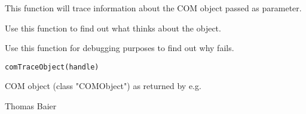 \begin{Description}\relax
This function will trace information about the COM object passed as parameter.

Use this function to find out what  thinks about the object.

Use this function for debugging purposes to find out why  fails.
\end{Description}
\begin{Usage}
\begin{verbatim}
comTraceObject(handle)
\end{verbatim}
\end{Usage}
\begin{Arguments}
\begin{ldescription}
\item[\code{handle}] COM object (class "COMObject") as returned by e.g.
\end{ldescription}
\end{Arguments}
\begin{Author}\relax
Thomas Baier
\end{Author}


